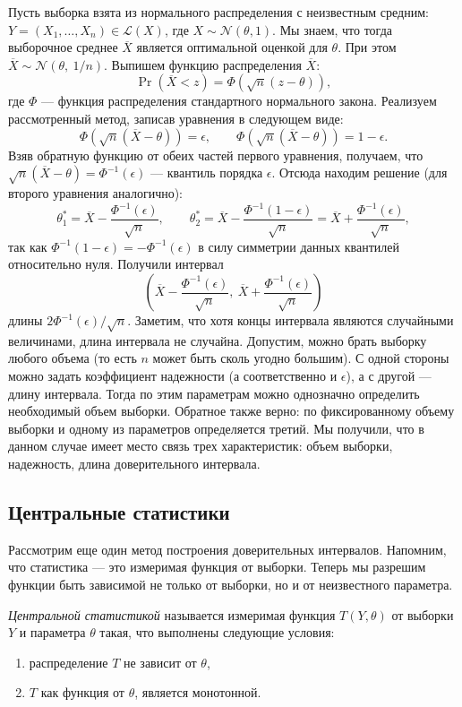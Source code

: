 \begin{example}
    Пусть выборка взята из нормального распределения с неизвестным средним: $Y = (X_1, \ldots, X_n) \in \mathcal{L}(X)$, где $X \sim \mathcal{N}(\theta, 1)$.
    Мы знаем, что тогда выборочное среднее $\overline{X}$ является оптимальной оценкой для $\theta$.
    При этом $\overline{X} \sim \mathcal{N}(\theta,\ 1/n)$. Выпишем функцию распределения $\overline{X}$:
    \[
        \Pr(\overline{X} < z) = \Phi(\sqrt{n}(z - \theta)),
    \]
где $\Phi$ --- функция распределения стандартного нормального закона.
    Реализуем рассмотренный метод, записав уравнения в следующем виде:
    \[
        \Phi(\sqrt{n}(\overline{X} - \theta)) = \epsilon, \qquad \Phi(\sqrt{n}(\overline{X} - \theta)) = 1 - \epsilon.
    \]
Взяв обратную функцию от обеих частей первого уравнения, получаем, что $\sqrt{n}(\overline{X} - \theta) = \Phi^{-1}(\epsilon)$ --- квантиль порядка $\epsilon$.
    Отсюда находим решение (для второго уравнения аналогично):
    \[
        \theta_1^* = \overline{X} - \frac{\Phi^{-1}(\epsilon)}{\sqrt{n}}, \qquad \theta_2^* = \overline{X} - \frac{\Phi^{-1}(1-\epsilon)}{\sqrt{n}} = \overline{X} + \frac{\Phi^{-1}(\epsilon)}{\sqrt{n}},
    \]
так как $\Phi^{-1}(1-\epsilon) = -\Phi^{-1}(\epsilon)$ в силу симметрии данных квантилей относительно нуля.
    Получили интервал
    \[
        \left(\overline{X} - \frac{\Phi^{-1}(\epsilon)}{\sqrt{n}},\ \overline{X} + \frac{\Phi^{-1}(\epsilon)}{\sqrt{n}}\right)
    \]
длины $2\Phi^{-1}(\epsilon) / \sqrt{n}$.
    Заметим, что хотя концы интервала являются случайными величинами, длина интервала не случайна.
    Допустим, можно брать выборку любого объема (то есть $n$ может быть сколь угодно большим).
    С одной стороны можно задать коэффициент надежности (а соответственно и $\epsilon$), а с другой --- длину интервала.
    Тогда по этим параметрам можно однозначно определить необходимый объем выборки.
    Обратное также верно: по фиксированному объему выборки и одному из параметров определяется третий.
    Мы получили, что в данном случае имеет место связь трех характеристик: объем выборки, надежность, длина доверительного интервала.
\end{example}

\subsection{Центральные статистики}
Рассмотрим еще один метод построения доверительных интервалов.
Напомним, что статистика --- это измеримая функция от выборки.
Теперь мы разрешим функции быть зависимой не только от выборки, но и от неизвестного параметра.
\begin{definition}
    \emph{Центральной статистикой} называется измеримая функция $T(Y, \theta)$ от выборки $Y$ и параметра $\theta$ такая, что выполнены следующие условия:
    \begin{enumerate}
        \item распределение $T$ не зависит от $\theta$,
        \item $T$ как функция от $\theta$, является монотонной.
    \end{enumerate}
\end{definition}

